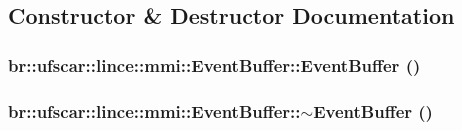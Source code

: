 \subsection{Constructor \& Destructor Documentation}
\hypertarget{classbr_1_1ufscar_1_1lince_1_1mmi_1_1EventBuffer_ad56636c9a70bd3ee6c81d8a15dfb7c82}{
\subsubsection[{EventBuffer}]{\setlength{\rightskip}{0pt plus 5cm}br::ufscar::lince::mmi::EventBuffer::EventBuffer ()}}
\label{classbr_1_1ufscar_1_1lince_1_1mmi_1_1EventBuffer_ad56636c9a70bd3ee6c81d8a15dfb7c82}
\hypertarget{classbr_1_1ufscar_1_1lince_1_1mmi_1_1EventBuffer_a9d3d15129e46525a9399216b9b6d02eb}{
\subsubsection[{$\sim$EventBuffer}]{\setlength{\rightskip}{0pt plus 5cm}br::ufscar::lince::mmi::EventBuffer::$\sim$EventBuffer ()}}
\label{classbr_1_1ufscar_1_1lince_1_1mmi_1_1EventBuffer_a9d3d15129e46525a9399216b9b6d02eb}


